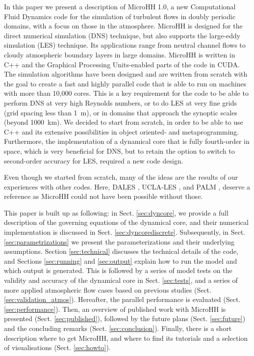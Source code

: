 \documentclass[gmd,manuscript]{copernicus}
\begin{document}
\introduction  %
In this paper we present a description of MicroHH 1.0, a new Computational Fluid Dynamics code for the simulation of turbulent flows in doubly periodic domains, with a focus on those in the atmosphere. MicroHH is designed for the direct numerical simulation (DNS) technique, but also supports the large-eddy simulation (LES) technique. Its applications range from neutral channel flows to cloudy atmospheric boundary layers in large domains. MicroHH is written in C++ and the Graphical Processing Units-enabled parts of the code in CUDA. The simulation algorithms have been designed and are written from scratch with the goal to create a fast and highly parallel code that is able to run on machines with more than 10,000 cores. This is a key requirement for the code to be able to perform DNS at very high Reynolds numbers, or to do LES at very fine grids (grid spacing less than 1~m), or in domains that approach the synoptic scales (beyond 1000~km). We decided to start from scratch, in order to be able to use C++ and its extensive possibilities in object oriented- and metaprogramming. Furthermore, the implementation of a dynamical core that is fully fourth-order in space, which is very beneficial for DNS, but to retain the option to switch to second-order accuracy for LES, required a new code design.

Even though we started from scratch, many of the ideas are the results of our experiences with other codes. Here, DALES \citep{Heus2010}, UCLA-LES \citep{Stevens2005}, and PALM \citep{Maronga2015}, deserve a reference as MicroHH could not have been possible without those.

This paper is built up as following: in Sect. \ref{sec:dyncore}, we provide a full description of the governing equations of the dynamical core, and their numerical implementation is discussed in Sect. \ref{sec:dyncorediscrete}. Subsequently, in Sect. \ref{sec:parametrizations} we present the parameterizations and their underlying assumptions. Section \ref{sec:technical} discusses the technical details of the code, and Sections \ref{sec:running} and \ref{sec:output} explain how to run the model and which output is generated. This is followed by a series of model tests on the validity and accuracy of the dynamical core in Sect. \ref{sec:tests}, and a series of more applied atmospheric flow cases based on previous studies (Sect. \ref{sec:validation_atmos}). Hereafter, the parallel performance is evaluated (Sect. \ref{sec:performance}). Then, an overview of published work with MicroHH is presented (Sect. \ref{sec:published}), followed by the future plans (Sect. \ref{sec:future}) and the concluding remarks (Sect. \ref{sec:conclusion}). Finally, there is a short description where to get MicroHH, and where to find its tutorials and a selection of visualisations (Sect. \ref{sec:howto}).
\end{document}
